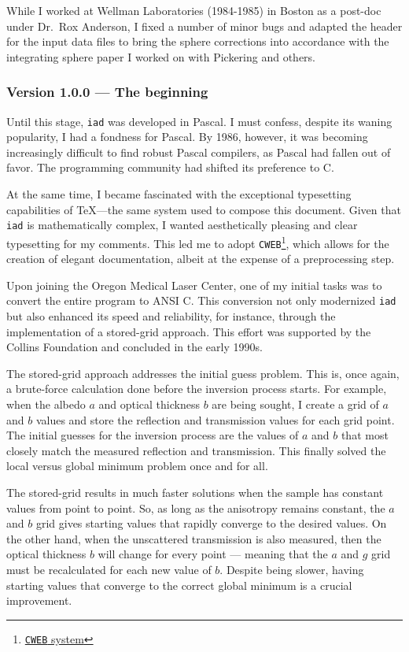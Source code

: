 \documentclass{article}
\newcommand\iadprog{\texttt{iad}}
\begin{document}
While I worked at Wellman Laboratories (1984-1985) in Boston as a post-doc under Dr.\ Rox Anderson, 
I fixed a number of minor bugs and adapted the header for the input data files to bring the sphere
corrections into accordance with the integrating sphere paper I worked on with Pickering and
others.  

\subsubsection*{Version 1.0.0 --- The beginning}

Until this stage, \iadprog{} was developed in Pascal.  I must confess, despite its waning popularity, I had a fondness for Pascal.  By 1986, however, it was becoming increasingly difficult to find robust Pascal compilers, as Pascal had fallen out of favor. The programming community had shifted its preference to C.

At the same time, I became fascinated with the exceptional typesetting capabilities of \TeX{}---the same system used to compose this document.  Given that \iadprog{} is mathematically complex, I wanted aesthetically pleasing and clear typesetting for my comments.  This led me to adopt \texttt{CWEB}\footnote{\href{https://github.com/ascherer/cwebbin}{\texttt{CWEB} system}}, which allows for the creation of elegant documentation, albeit at the expense of a preprocessing step.

Upon joining the Oregon Medical Laser Center, one of my initial tasks was to convert the entire program to ANSI C.  This conversion not only modernized \iadprog{} but also enhanced its speed and reliability, for instance, through the implementation of a stored-grid approach.  This effort was supported by the Collins Foundation and concluded in the early 1990s.

The stored-grid approach addresses the initial guess problem.  This is, once again, a
brute-force calculation done before the inversion process starts.  For example, when the albedo $a$ and optical thickness
$b$ are being sought, I create a grid of $a$ and $b$ values and store the reflection 
and transmission values for each grid point.  The initial guesses for the inversion process are
the values of $a$ and $b$ that most closely match the measured reflection and transmission.  This finally solved the local versus global minimum problem once and for all.

The stored-grid results in much faster solutions when the sample has constant
values from point to point.  So, as long as the anisotropy remains constant, the $a$ and $b$
grid gives starting values that rapidly converge to the desired values.  On the other
hand, when the unscattered transmission is also measured, then the optical thickness
$b$ will change for every point --- meaning that the $a$ and $g$ grid must be recalculated
for each new value of $b$.  Despite being slower, having starting values that 
converge to the correct global minimum is a crucial improvement.
\end{document}
